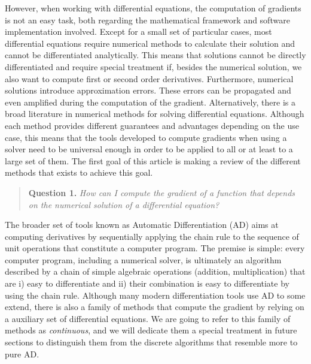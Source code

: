 However, when working with differential equations, the computation of gradients is not an easy task, both regarding the mathematical framework and software implementation involved. 
Except for a small set of particular cases, most differential equations require numerical methods to calculate their solution and cannot be differentiated analytically. 
This means that solutions cannot be directly differentiated and require special treatment if, besides the numerical solution, we also want to compute first or second order derivatives. 
Furthermore, numerical solutions introduce approximation errors. 
These errors can be propagated and even amplified during the computation of the gradient. 
Alternatively, there is a broad literature in numerical methods for solving differential equations. 
Although each method provides different guarantees and advantages depending on the use case, this means that the tools developed to compute gradients when using a solver need to be universal enough in order to be applied to all or 
at least to a large set of them. 
The first goal of this article is making a review of the different methods that exists to achieve this goal.
\begin{quote}
    \textbf{Question 1. }
    \textit{How can I compute the gradient of a function that depends on the numerical solution of a differential equation?}
\end{quote}

The broader set of tools known as Automatic Differentiation (AD) aims at computing derivatives by sequentially applying the chain rule to the sequence of unit operations that constitute a computer program. 
The premise is simple: every computer program, including a numerical solver, is ultimately an algorithm described by a chain of simple algebraic operations (addition, multiplication) that are i) easy to differentiate and ii) their combination is easy to differentiate by using the chain rule. 
Although many modern differentiation tools use AD to some extend, there is also a family of methods that compute the gradient by relying on a auxiliary set of differential equations. 
We are going to refer to this family of methods as \textit{continuous}, and we will dedicate them a special treatment in future sections to distinguish them from the discrete algorithms that resemble more to pure AD. 

